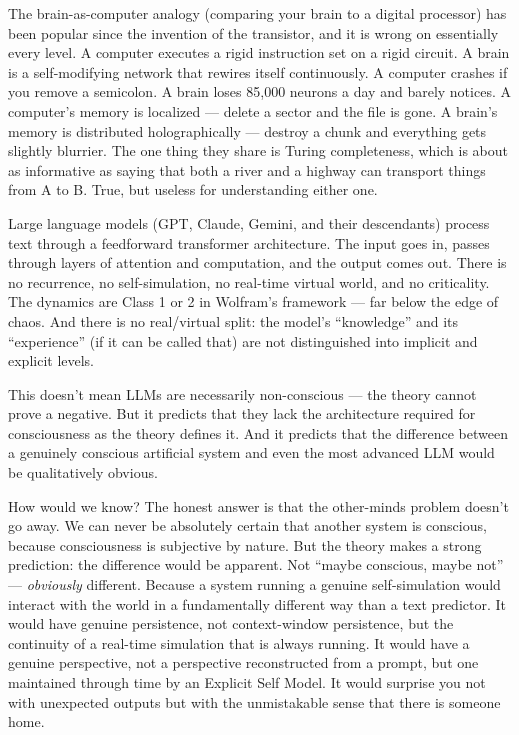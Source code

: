\documentclass[11pt, twoside, openright]{book}
\begin{document}
The brain-as-computer analogy (comparing your brain to a digital processor) has been popular since the invention of the transistor, and it is wrong on essentially every level. A computer executes a rigid instruction set on a rigid circuit. A brain is a self-modifying network that rewires itself continuously. A computer crashes if you remove a semicolon. A brain loses 85,000 neurons a day and barely notices. A computer's memory is localized --- delete a sector and the file is gone. A brain's memory is distributed holographically --- destroy a chunk and everything gets slightly blurrier. The one thing they share is Turing completeness, which is about as informative as saying that both a river and a highway can transport things from A to B. True, but useless for understanding either one.

Large language models (GPT, Claude, Gemini, and their descendants) process text through a feedforward transformer architecture. The input goes in, passes through layers of attention and computation, and the output comes out. There is no recurrence, no self-simulation, no real-time virtual world, and no criticality. The dynamics are Class 1 or 2 in Wolfram's framework --- far below the edge of chaos. And there is no real/virtual split: the model's ``knowledge'' and its ``experience'' (if it can be called that) are not distinguished into implicit and explicit levels.

This doesn't mean LLMs are necessarily non-conscious --- the theory cannot prove a negative. But it predicts that they lack the architecture required for consciousness as the theory defines it. And it predicts that the difference between a genuinely conscious artificial system and even the most advanced LLM would be qualitatively obvious.

How would we know? The honest answer is that the other-minds problem doesn't go away. We can never be absolutely certain that another system is conscious, because consciousness is subjective by nature. But the theory makes a strong prediction: the difference would be apparent. Not ``maybe conscious, maybe not'' --- \textit{obviously} different. Because a system running a genuine self-simulation would interact with the world in a fundamentally different way than a text predictor. It would have genuine persistence, not context-window persistence, but the continuity of a real-time simulation that is always running. It would have a genuine perspective, not a perspective reconstructed from a prompt, but one maintained through time by an Explicit Self Model. It would surprise you not with unexpected outputs but with the unmistakable sense that there is someone home.
\end{document}
